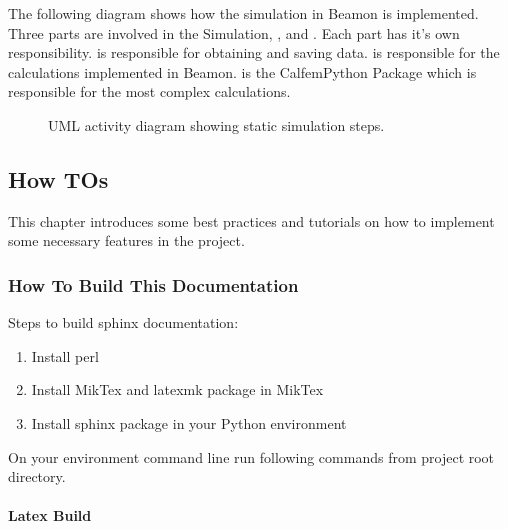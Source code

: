 \documentclass[letterpaper,10pt,english]{sphinxmanual}
\begin{document}
The following diagram shows how the simulation in Beamon is implemented. Three parts are involved in the Simulation,
,  and . Each part has it’s own responsibility.  is responsible for obtaining and
saving data.  is responsible for the calculations implemented in Beamon.  is the Calfem\sphinxhyphen{}Python Package
which is responsible for the most complex calculations.

\begin{figure}[htbp]
\centering
\capstart

\noindent{}
\caption{UML activity diagram showing static simulation steps.}\label{\detokenize{implementation:id6}}\end{figure}


\subsection{How TOs}
\label{\detokenize{howto:how-tos}}\label{\detokenize{howto::doc}}
This chapter introduces some best practices and tutorials on how to implement some necessary features in the project.


\subsubsection{How To Build This Documentation}
\label{\detokenize{howto:how-to-build-this-documentation}}
Steps to build sphinx documentation:
\begin{enumerate}
%
\item {} 
Install perl

\item {} 
Install MikTex and latexmk package in MikTex

\item {} 
Install sphinx package in your Python environment

\end{enumerate}

On your environment command line run following commands from project root directory.


\paragraph{Latex Build}
\label{\detokenize{howto:latex-build}}
\begin{sphinxVerbatim}[commandchars=\\\{\}]
     \PYGZbs{} \PYGZbs{}\PYGZbs{}
\end{sphinxVerbatim}
\end{document}
